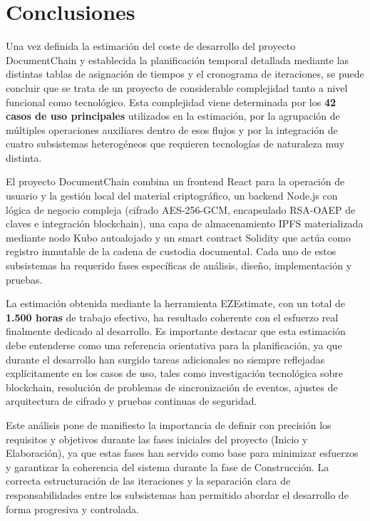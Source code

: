 \documentclass[11pt, a4paper]{article}
\begin{document}
\section{Conclusiones}

Una vez definida la estimación del coste de desarrollo del proyecto DocumentChain y establecida la planificación temporal detallada mediante las distintas tablas de asignación de tiempos y el cronograma de iteraciones, se puede concluir que se trata de un proyecto de considerable complejidad tanto a nivel funcional como tecnológico. Esta complejidad viene determinada por los \textbf{42 casos de uso principales} utilizados en la estimación, por la agrupación de múltiples operaciones auxiliares dentro de esos flujos y por la integración de cuatro subsistemas heterogéneos que requieren tecnologías de naturaleza muy distinta.

El proyecto DocumentChain combina un frontend React para la operación de usuario y la gestión local del material criptográfico, un backend Node.js con lógica de negocio compleja (cifrado AES-256-GCM, encapsulado RSA-OAEP de claves e integración blockchain), una capa de almacenamiento IPFS materializada mediante nodo Kubo autoalojado y un smart contract Solidity que actúa como registro inmutable de la cadena de custodia documental. Cada uno de estos subsistemas ha requerido fases específicas de análisis, diseño, implementación y pruebas.

La estimación obtenida mediante la herramienta EZEstimate, con un total de \textbf{1.500 horas} de trabajo efectivo, ha resultado coherente con el esfuerzo real finalmente dedicado al desarrollo. Es importante destacar que esta estimación debe entenderse como una referencia orientativa para la planificación, ya que durante el desarrollo han surgido tareas adicionales no siempre reflejadas explícitamente en los casos de uso, tales como investigación tecnológica sobre blockchain, resolución de problemas de sincronización de eventos, ajustes de arquitectura de cifrado y pruebas continuas de seguridad.

Este análisis pone de manifiesto la importancia de definir con precisión los requisitos y objetivos durante las fases iniciales del proyecto (Inicio y Elaboración), ya que estas fases han servido como base para minimizar esfuerzos y garantizar la coherencia del sistema durante la fase de Construcción. La correcta estructuración de las iteraciones y la separación clara de responsabilidades entre los subsistemas han permitido abordar el desarrollo de forma progresiva y controlada.
\end{document}
